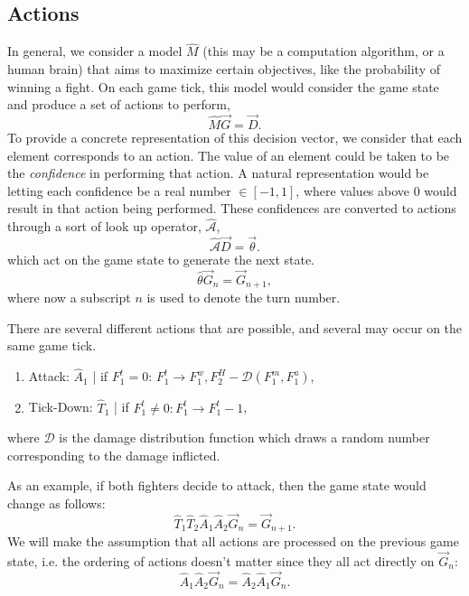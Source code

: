 	\subsection{Actions}
		In general, we consider a model $\hat M$ (this may be a computation algorithm, or a human brain) that aims to maximize certain objectives, like the probability of winning a fight. On each game tick, this model would consider the game state and produce a set of actions to perform,
		\begin{equation}
			\hat M \vec{G} = \vec{D}.
		\end{equation}
		To provide a concrete representation of this decision vector, we consider that each element corresponds to an action. The value of an element could be taken to be the \textit{confidence} in performing that action. A natural representation would be letting each confidence be a real number $\in [-1, 1]$, where values above 0 would result in that action being performed. These confidences are converted to actions through a sort of look up operator, $\hat{\mathcal{A}}$,
		\begin{equation}
			\hat{\mathcal{A}} \vec{D} = \vec{\theta}.
		\end{equation}
		which act on the game state to generate the next state.
		\begin{equation}
			\hat{\mathcal{\theta}} \vec{G}_n = \vec{G}_{n+1},
		\end{equation}
		where now a subscript $n$ is used to denote the turn number.

		There are several different actions that are possible, and several may occur on the same game tick.
		\begin{enumerate}
			\item Attack: $\hat A_1$ | if $F_1^t = 0$: $F_1^t \to F_1^w, F_2^H - \mathcal{D}(F_1^m, F_1^a)$,
			\item Tick-Down: $\hat T_1$ | if $F_1^t \neq 0 : F_1^t \to F_1^t - 1$,
		\end{enumerate}
		where $\mathcal{D}$ is the damage distribution function which draws a random number corresponding to the damage inflicted.

		As an example, if both fighters decide to attack, then the game state would change as follows:
		\begin{equation}
			\hat{T}_1\hat{T}_2\hat{A}_1\hat{A}_2 \vec{G}_n = \vec{G}_{n+1}.
		\end{equation}
		We will make the assumption that all actions are processed on the previous game state, i.e. the ordering of actions doesn't matter since they all act directly on $\vec{G}_n$:
		\begin{equation}
			\hat{A}_1\hat{A}_2 \vec{G}_n = \hat{A}_2\hat{A}_1 \vec{G}_n.
		\end{equation}

